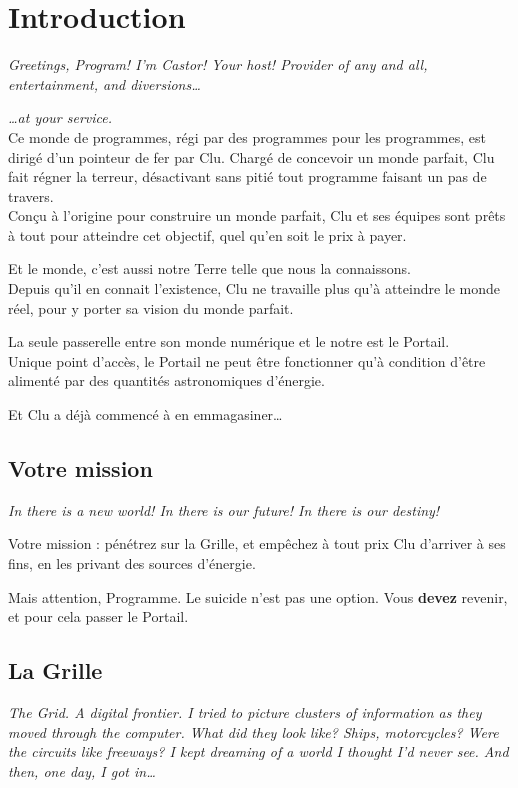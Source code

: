 \section{Introduction}
\textit{Greetings, Program! I'm Castor! Your host! Provider of any and
  all, entertainment, and diversions\ldots{}}

\textit{\ldots{}at your service.}\\

Ce monde de programmes, régi par des programmes pour les programmes,
est dirigé d'un pointeur de fer par Clu. Chargé de concevoir un monde
parfait, Clu fait régner la terreur, désactivant sans pitié tout programme
faisant un pas de travers.\\

Conçu à l'origine pour construire un monde parfait, Clu et ses équipes
sont prêts à tout pour atteindre cet objectif, quel qu'en soit le prix
à payer.

Et le monde, c'est aussi notre Terre telle que nous la connaissons.\\

Depuis qu'il en connait l'existence, Clu ne travaille plus qu'à
atteindre le monde réel, pour y porter sa vision du monde parfait.

La seule passerelle entre son monde numérique et le notre est le
Portail.\\

Unique point d'accès, le Portail ne peut être fonctionner qu'à
condition d'être alimenté par des quantités astronomiques d'énergie.

Et Clu a déjà commencé à en emmagasiner\ldots{}\\

        \subsection{Votre mission}
        \textit{In there is a new world! In there is our future! In
          there is our destiny!}

Votre mission : pénétrez sur la Grille, et empêchez à tout prix Clu
d'arriver à ses fins, en les privant des sources d'énergie.

Mais attention, Programme. Le suicide n'est pas une option. Vous
\textbf{devez} revenir, et pour cela passer le Portail.


        \subsection{La Grille}
        \textit{The Grid. A digital frontier. I tried to picture clusters
          of information as they moved through the computer. What did they
          look like? Ships, motorcycles? Were the circuits like freeways? I
          kept dreaming of a world I thought I'd never see. And then, one
          day, I got in\ldots{}}\\

